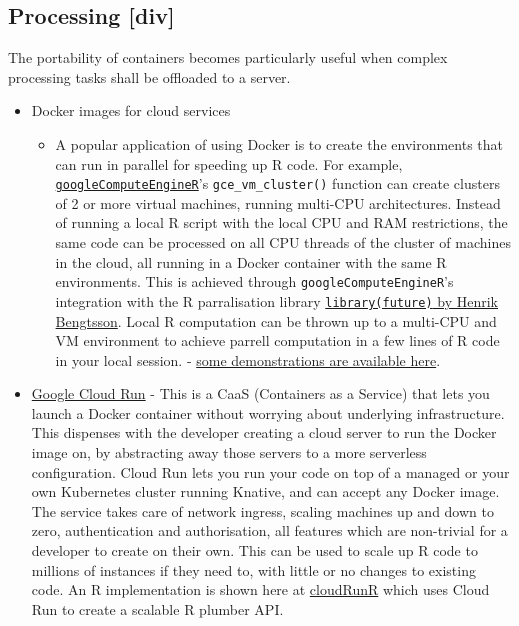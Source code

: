 \hypertarget{processing-div}{%
\subsection{Processing {[}div{]}}\label{processing-div}}

\label{processing}

The portability of containers becomes particularly useful when complex
processing tasks shall be offloaded to a server.

\begin{itemize}
\tightlist
\item
  Docker images for cloud services

  \begin{itemize}
  \tightlist
  \item
    A popular application of using Docker is to create the environments
    that can run in parallel for speeding up R code. For example,
    \href{https://CRAN.R-project.org/package=googleComputeEngineR}{\texttt{googleComputeEngineR}}'s
    \texttt{gce\_vm\_cluster()} function can create clusters of 2 or
    more virtual machines, running multi-CPU architectures. Instead of
    running a local R script with the local CPU and RAM restrictions,
    the same code can be processed on all CPU threads of the cluster of
    machines in the cloud, all running in a Docker container with the
    same R environments. This is achieved through
    \texttt{googleComputeEngineR}'s integration with the R parralisation
    library
    \href{https://CRAN.R-project.org/package=future}{\texttt{library(future)}
    by Henrik Bengtsson}. Local R computation can be thrown up to a
    multi-CPU and VM environment to achieve parrell computation in a few
    lines of R code in your local session. -
    \href{https://cloudyr.github.io/googleComputeEngineR/articles/massive-parallel.html}{some
    demonstrations are available here}.
  \end{itemize}
\item
  \href{https://cloud.run}{Google Cloud Run} - This is a CaaS
  (Containers as a Service) that lets you launch a Docker container
  without worrying about underlying infrastructure. This dispenses with
  the developer creating a cloud server to run the Docker image on, by
  abstracting away those servers to a more serverless configuration.
  Cloud Run lets you run your code on top of a managed or your own
  Kubernetes cluster running Knative, and can accept any Docker image.
  The service takes care of network ingress, scaling machines up and
  down to zero, authentication and authorisation, all features which are
  non-trivial for a developer to create on their own. This can be used
  to scale up R code to millions of instances if they need to, with
  little or no changes to existing code. An R implementation is shown
  here at
  \href{https://github.com/MarkEdmondson1234/cloudRunR}{cloudRunR} which
  uses Cloud Run to create a scalable R plumber API.


\end{itemize}
